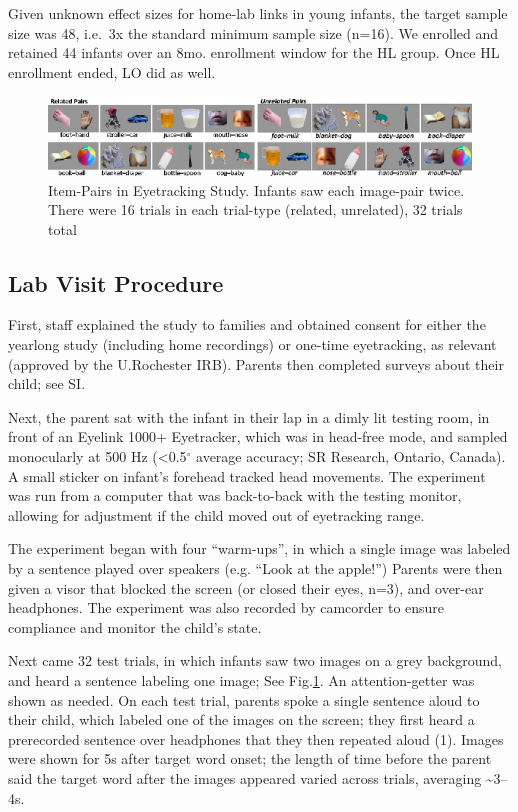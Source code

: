 \documentclass[9pt,twocolumn,twoside,]{pnas-new}
\begin{document}
Given unknown effect sizes for home-lab links in young infants, the
target sample size was 48, i.e.~3x the standard minimum sample size
(n=16). We enrolled and retained 44 infants over an 8mo. enrollment
window for the HL group. Once HL enrollment ended, LO did as well.

\begin{figure}[htbp]
\centering
\includegraphics{images/fig1_wide.eps}
\caption{\label{fig:f-itempairs}Item-Pairs in Eyetracking Study. Infants
saw each image-pair twice. There were 16 trials in each trial-type
(related, unrelated), 32 trials total}
\end{figure}

\subsection*{Lab Visit Procedure}\label{labvisproc}

First, staff explained the study to families and obtained consent for
either the yearlong study (including home recordings) or one-time
eyetracking, as relevant (approved by the U.Rochester IRB). Parents then
completed surveys about their child; see SI.

Next, the parent sat with the infant in their lap in a dimly lit testing
room, in front of an Eyelink 1000+ Eyetracker, which was in head-free
mode, and sampled monocularly at 500 Hz (\textless{}0.5\(^{\circ}\)
average accuracy; SR Research, Ontario, Canada). A small sticker on
infant's forehead tracked head movements. The experiment was run from a
computer that was back-to-back with the testing monitor, allowing for
adjustment if the child moved out of eyetracking range.

The experiment began with four ``warm-ups'', in which a single image was
labeled by a sentence played over speakers (e.g. ``Look at the apple!'')
Parents were then given a visor that blocked the screen (or closed their
eyes, n=3), and over-ear headphones. The experiment was also recorded by
camcorder to ensure compliance and monitor the child's state.

Next came 32 test trials, in which infants saw two images on a grey
background, and heard a sentence labeling one image; See
Fig.\ref{fig:f-itempairs}. An attention-getter was shown as needed. On
each test trial, parents spoke a single sentence aloud to their child,
which labeled one of the images on the screen; they first heard a
prerecorded sentence over headphones that they then repeated aloud (1).
Images were shown for 5s after target word onset; the length of time
before the parent said the target word after the images appeared varied
across trials, averaging \textasciitilde{}3--4s.
\end{document}
